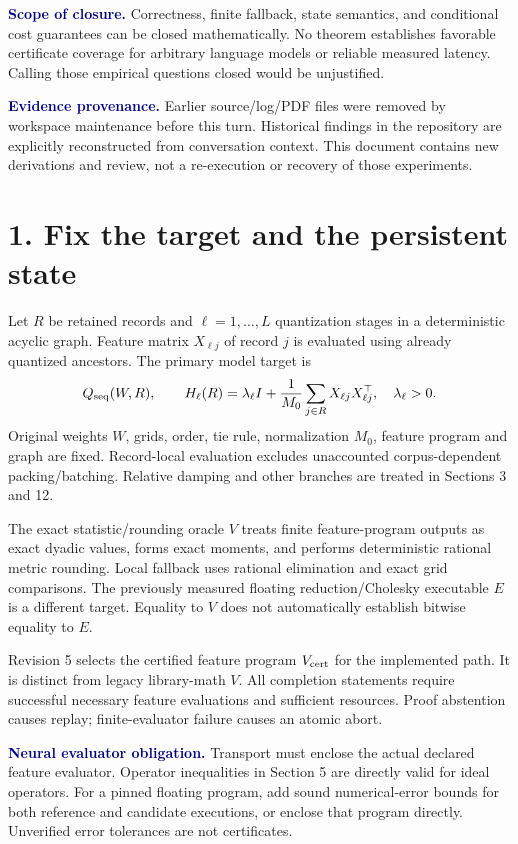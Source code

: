 \documentclass[11pt]{article}
\newcommand{\note}[1]{\textcolor{navy}{\textbf{#1}}}
\begin{document}
\note{Scope of closure.} Correctness, finite fallback, state semantics, and conditional cost guarantees can be closed mathematically. No theorem establishes favorable certificate coverage for arbitrary language models or reliable measured latency. Calling those empirical questions closed would be unjustified.

\note{Evidence provenance.} Earlier source/log/PDF files were removed by workspace maintenance before this turn. Historical findings in the repository are explicitly reconstructed from conversation context. This document contains new derivations and review, not a re-execution or recovery of those experiments.

\newpage
\section*{1. Fix the target and the persistent state}
Let $R$ be retained records and $\ell=1,\ldots,L$ quantization stages in a deterministic acyclic graph. Feature matrix $X_{\ell j}$ of record $j$ is evaluated using already quantized ancestors. The primary model target is
\[
 Q_{\rm seq}(W,R),\qquad
 H_\ell(R)=\lambda_\ell I+\frac1{M_0}\sum_{j\in R}X_{\ell j}X_{\ell j}^{\top},
 \quad \lambda_\ell>0.
\]
Original weights $W$, grids, order, tie rule, normalization $M_0$, feature program and graph are fixed. Record-local evaluation excludes unaccounted corpus-dependent packing/batching. Relative damping and other branches are treated in Sections 3 and 12.

The exact statistic/rounding oracle $V$ treats finite feature-program outputs as exact dyadic values, forms exact moments, and performs deterministic rational metric rounding. Local fallback uses rational elimination and exact grid comparisons. The previously measured floating reduction/Cholesky executable $E$ is a different target. Equality to $V$ does not automatically establish bitwise equality to $E$.

Revision 5 selects the certified feature program $V_{\rm cert}$ for the implemented path. It is distinct from legacy library-math $V$. All completion statements require successful necessary feature evaluations and sufficient resources. Proof abstention causes replay; finite-evaluator failure causes an atomic abort.

\note{Neural evaluator obligation.} Transport must enclose the actual declared feature evaluator. Operator inequalities in Section 5 are directly valid for ideal operators. For a pinned floating program, add sound numerical-error bounds for both reference and candidate executions, or enclose that program directly. Unverified error tolerances are not certificates.
\end{document}
